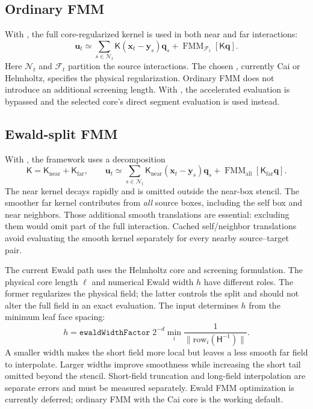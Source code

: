 \subsection{Ordinary FMM}
With , the full core-regularized kernel is used in both
near and far interactions:
\begin{equation}
 \bm u_t\simeq
 \sum_{s\in\mathcal N_t}\mathsf K(\bm x_t-\bm y_s)\bm q_s
 +\operatorname{FMM}_{\mathcal F_t}[\mathsf K\bm q].
\end{equation}
Here $\mathcal N_t$ and $\mathcal F_t$ partition the source interactions.
The chosen , currently Cai or Helmholtz, specifies the physical
regularization. Ordinary FMM does not introduce an additional screening length.
With , the accelerated evaluation is bypassed and the
selected core's direct segment evaluation is used instead.

\subsection{Ewald-split FMM}
With , the framework uses a decomposition
\begin{equation}
 \mathsf K=\mathsf K_{\mathrm{near}}+\mathsf K_{\mathrm{far}},
 \qquad
 \bm u_t\simeq
 \sum_{s\in\mathcal N_t}\mathsf K_{\mathrm{near}}(\bm x_t-\bm y_s)\bm q_s
 +\operatorname{FMM}_{\mathrm{all}}[\mathsf K_{\mathrm{far}}\bm q].
 \label{eq:fmmSplit}
\end{equation}
The near kernel decays rapidly and is omitted outside the near-box stencil.
The smoother far kernel contributes from \emph{all} source boxes, including
the self box and near neighbors. Those additional smooth translations are
essential: excluding them would omit part of the full interaction. Cached
self/neighbor translations avoid evaluating the smooth kernel separately for
every nearby source--target pair.

The current Ewald path uses the Helmholtz core and screening formulation.
The physical core length $\ell$ and numerical Ewald width $h$ have different
roles. The former regularizes the physical field; the latter controls the
split and should not alter the full field in an exact evaluation. The input
 determines $h$ from the minimum leaf face spacing:
\begin{equation}
 h=\texttt{ewaldWidthFactor}\;2^{-d}
       \min_i\frac{1}{\|\text{row}_i(\mathsf H^{-1})\|}.
\end{equation}
A smaller width makes the short field more local but leaves a less smooth far
field to interpolate. Larger widths improve smoothness while increasing the
short tail omitted beyond the stencil. Short-field truncation and long-field
interpolation are separate errors and must be measured separately. Ewald FMM
optimization is currently deferred; ordinary FMM with the Cai core is the
working default.

